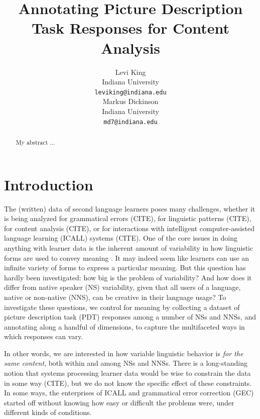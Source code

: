 \documentclass[11pt,a4paper]{article}
\title{Annotating Picture Description Task Responses for Content Analysis}
\author{Levi King \\
  Indiana University \\
  {\tt leviking@indiana.edu} \\\And
  Markus Dickinson \\
  Indiana University \\
  {\tt md7@indiana.edu} \\}
\date{}
\begin{document}
\maketitle
\begin{abstract}
My abstract ...

\end{abstract}


\section{Introduction}

The (written) data of second language learners poses many challenges,
whether it is being analyzed for grammatical errors (CITE), for
linguistic patterns (CITE), for content analysis (CITE), or for
interactions with intelligent computer-assisted language learning
(ICALL) systems (CITE).  One of the core issues in doing anything with
learner data is the inherent amount of variability in how linguistic
forms are used to convey meaning \citep{Meurers.Dickinson-17}.
It may indeed seem like learners can use an infinite variety of forms
to express a particular meaning.  But this question has hardly been
investigated: how big is the problem of variability?  And how does it
differ from native speaker (NS) variability, given that all users of a
language, native or non-native (NNS), can be creative in their
language usage?  To investigate these questions, we control for
meaning by collecting a dataset of picture description task (PDT)
responses among a number of NSs and NNSs, and annotating along a
handful of dimensions, to capture the multifaceted ways in which
responses can vary.


In other words, we are interested in how variable linguistic behavior
is \emph{for the same content}, both within and among NSs and NNSs.
There is a long-standing notion that systems processing learner data
would be wise to constrain the data in some way (CITE), but we do not
know the specific effect of these constraints.  In some ways, the
enterprises of ICALL and grammatical error correction (GEC) started
off without knowing how easy or difficult the problems were, under
different kinds of conditions.
\end{document}
